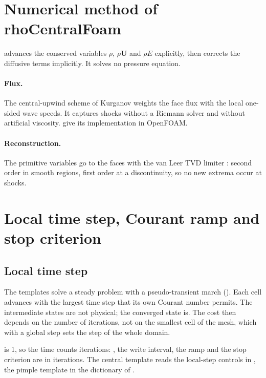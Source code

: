 \section{Numerical method of rhoCentralFoam}

 advances the conserved variables $\rho$, $\rho\mathbf{U}$ and
$\rho E$ explicitly, then corrects the diffusive terms implicitly. It solves no
pressure equation.

\paragraph{Flux.} The central-upwind scheme of Kurganov
\citep{kurganov2000,kurganov2001} weights the face flux with the local one-sided wave
speeds. It captures shocks without a Riemann solver and without artificial viscosity.
\citet{greenshields2010} give its implementation in OpenFOAM.

\paragraph{Reconstruction.} The primitive variables go to the faces with the van Leer
TVD limiter \citep{vanleer1979}: second order in smooth regions, first order at a
discontinuity, so no new extrema occur at shocks.

\section{Local time step, Courant ramp and stop criterion}

\subsection{Local time step}\label{sec:lts}

The templates solve a steady problem with a pseudo-transient march (). Each cell advances with the largest time step that its own Courant number
permits. The intermediate states are not physical; the converged state is. The cost
then depends on the number of iterations, not on the smallest cell of the mesh, which
with a global step sets the step of the whole domain.

 is 1, so the time counts iterations: , the write interval,
the ramp and the stop criterion are in iterations. The central template reads the
local-step controls in , the pimple template in the 
dictionary of .

